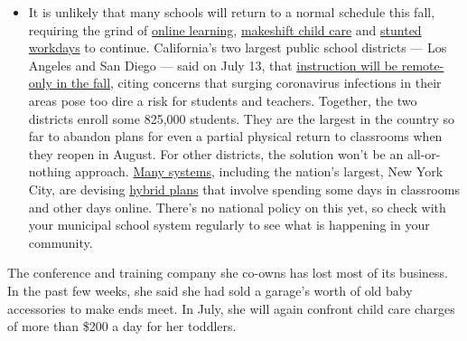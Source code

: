 \begin{itemize}
  \begin{itemize}
  \tightlist
  \item
    It is unlikely that many schools will return to a normal schedule
    this fall, requiring the grind of
    \href{https://www.nytimes3xbfgragh.onion/2020/06/05/us/coronavirus-education-lost-learning.html?action=click\&pgtype=Article\&state=default\&region=MAIN_CONTENT_3\&context=storylines_faq}{online
    learning},
    \href{https://www.nytimes3xbfgragh.onion/2020/05/29/us/coronavirus-child-care-centers.html?action=click\&pgtype=Article\&state=default\&region=MAIN_CONTENT_3\&context=storylines_faq}{makeshift
    child care} and
    \href{https://www.nytimes3xbfgragh.onion/2020/06/03/business/economy/coronavirus-working-women.html?action=click\&pgtype=Article\&state=default\&region=MAIN_CONTENT_3\&context=storylines_faq}{stunted
    workdays} to continue. California's two largest public school
    districts --- Los Angeles and San Diego --- said on July 13, that
    \href{https://www.nytimes3xbfgragh.onion/2020/07/13/us/lausd-san-diego-school-reopening.html?action=click\&pgtype=Article\&state=default\&region=MAIN_CONTENT_3\&context=storylines_faq}{instruction
    will be remote-only in the fall}, citing concerns that surging
    coronavirus infections in their areas pose too dire a risk for
    students and teachers. Together, the two districts enroll some
    825,000 students. They are the largest in the country so far to
    abandon plans for even a partial physical return to classrooms when
    they reopen in August. For other districts, the solution won't be an
    all-or-nothing approach.
    \href{https://bioethics.jhu.edu/research-and-outreach/projects/eschool-initiative/school-policy-tracker/}{Many
    systems}, including the nation's largest, New York City, are
    devising
    \href{https://www.nytimes3xbfgragh.onion/2020/06/26/us/coronavirus-schools-reopen-fall.html?action=click\&pgtype=Article\&state=default\&region=MAIN_CONTENT_3\&context=storylines_faq}{hybrid
    plans} that involve spending some days in classrooms and other days
    online. There's no national policy on this yet, so check with your
    municipal school system regularly to see what is happening in your
    community.
  \end{itemize}
\end{itemize}

The conference and training company she co-owns has lost most of its
business. In the past few weeks, she said she had sold a garage's worth
of old baby accessories to make ends meet. In July, she will again
confront child care charges of more than \$200 a day for her toddlers.

